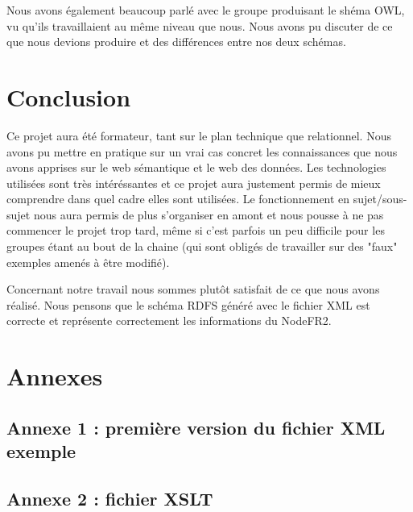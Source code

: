 \documentclass{article}
\begin{document}
Nous avons également beaucoup parlé avec le groupe produisant le shéma OWL, vu qu'ils travaillaient au même niveau que nous. Nous avons pu discuter de ce que nous devions produire et des différences entre nos deux schémas. 

\newpage
\section{Conclusion}
Ce projet aura été formateur, tant sur le plan technique que relationnel. Nous avons pu mettre en pratique sur un vrai cas concret les connaissances que nous avons apprises sur le web sémantique et le web des données. Les technologies utilisées sont très intéréssantes et ce projet aura justement permis de mieux comprendre dans quel cadre elles sont utilisées. Le fonctionnement en sujet/sous-sujet nous aura permis de plus s'organiser en amont et nous pousse à ne pas commencer le projet trop tard, même si c'est parfois un peu difficile pour les groupes étant au bout de la chaine (qui sont obligés de travailler sur des "faux" exemples amenés à être modifié).

Concernant notre travail nous sommes plutôt satisfait de ce que nous avons réalisé. Nous pensons que le schéma RDFS généré avec le fichier XML est correcte et représente correctement les informations du NodeFR2.

\newpage
\section{Annexes}
\subsection{Annexe 1 : première version du fichier XML exemple}
\begin{center}
\tiny 
\end{center}
\subsection{Annexe 2 : fichier XSLT}
\begin{center}
\tiny 
\end{center}
\end{document}
